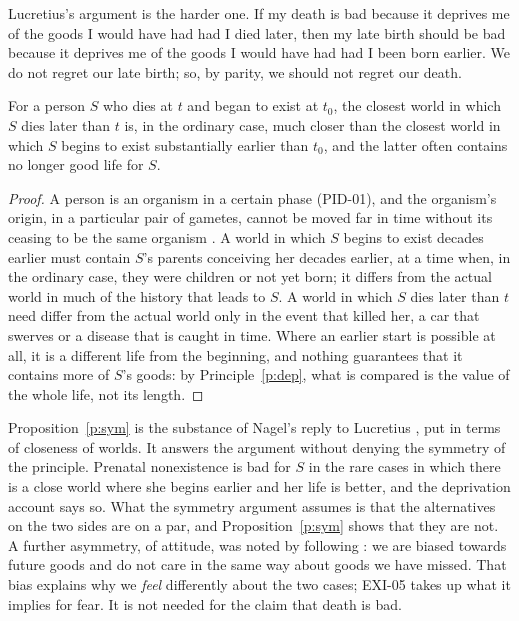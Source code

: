 \documentclass{situationist-preprint}
\begin{document}
Lucretius's argument is the harder one. If my death is bad because it deprives me of the goods I would have had had I died later, then my late birth should be bad because it deprives me of the goods I would have had had I been born earlier. We do not regret our late birth; so, by parity, we should not regret our death.

\begin{proposition}\label{p:sym}
For a person $S$ who dies at $t$ and began to exist at $t_0$, the closest world in which $S$ dies later than $t$ is, in the ordinary case, much closer than the closest world in which $S$ begins to exist substantially earlier than $t_0$, and the latter often contains no longer good life for $S$.
\end{proposition}

\begin{proof}
A person is an organism in a certain phase (PID-01), and the organism's origin, in a particular pair of gametes, cannot be moved far in time without its ceasing to be the same organism \citep{Kripke1980}. A world in which $S$ begins to exist decades earlier must contain $S$'s parents conceiving her decades earlier, at a time when, in the ordinary case, they were children or not yet born; it differs from the actual world in much of the history that leads to $S$. A world in which $S$ dies later than $t$ need differ from the actual world only in the event that killed her, a car that swerves or a disease that is caught in time. Where an earlier start is possible at all, it is a different life from the beginning, and nothing guarantees that it contains more of $S$'s goods: by Principle~\ref{p:dep}, what is compared is the value of the whole life, not its length.
\end{proof}

Proposition~\ref{p:sym} is the substance of Nagel's reply to Lucretius \citep{Nagel1970}, put in terms of closeness of worlds. It answers the argument without denying the symmetry of the principle. Prenatal nonexistence is bad for $S$ in the rare cases in which there is a close world where she begins earlier and her life is better, and the deprivation account says so. What the symmetry argument assumes is that the alternatives on the two sides are on a par, and Proposition~\ref{p:sym} shows that they are not. A further asymmetry, of attitude, was noted by \citet{BruecknerFischer1986} following \citet[\S 64]{Parfit1984}: we are biased towards future goods and do not care in the same way about goods we have missed. That bias explains why we \emph{feel} differently about the two cases; EXI-05 takes up what it implies for fear. It is not needed for the claim that death is bad.
\end{document}
